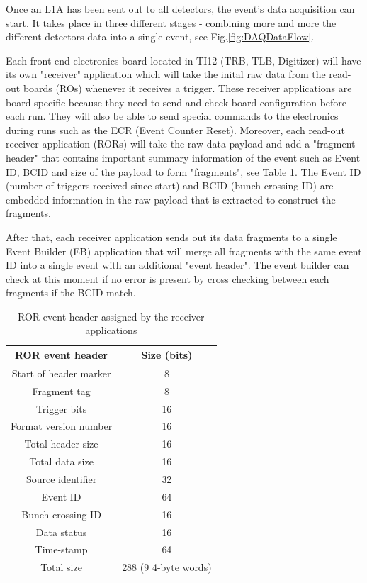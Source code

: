 Once an L1A has been sent out to all detectors, the event's data acquisition can start. It takes place in three different stages - combining more and more the different detectors data into a single event, see Fig.\ref{fig:DAQDataFlow}.

Each front-end electronics board located in TI12 (TRB, TLB, Digitizer) will have its own "receiver" application which will take the inital raw data from the read-out boards (ROs) whenever it receives a trigger. These receiver applications are board-specific because they need to send and check board configuration before each run. They will also be able to send special commands to the electronics during runs such as the ECR (Event Counter Reset). Moreover, each read-out receiver application (RORs) will take the raw data payload and add a  "fragment header" that contains important summary information of the event such as Event ID, BCID and size of the payload to form "fragments", see Table \ref{table:RORHeader}. The Event ID (number of triggers received since start) and BCID (bunch crossing ID) are embedded information in the raw payload that is extracted to construct the fragments.

After that, each receiver application sends out its data fragments to a single Event Builder (EB) application that will merge all fragments with the same event ID into a single event with an additional "event header". The event builder can check at this moment if no error is present by cross checking between each fragments if the BCID match.



\begin{table}[htbp!] 
\caption{ROR event header assigned by the receiver applications}
\centering
\label{table:RORHeader}
\begin{tabular}{c c}
\toprule
ROR event header & Size (bits) \\
\midrule
Start of header marker & 8\\
Fragment tag & 8\\
Trigger bits & 16\\
Format version number & 16\\
Total header size & 16\\
Total data size & 16\\
Source identifier & 32\\
Event ID & 64\\
Bunch crossing ID & 16\\
Data status & 16\\
Time-stamp & 64\\
\midrule
Total size & 288 (9 4-byte words)\\
\bottomrule
\end{tabular}
\end{table}


